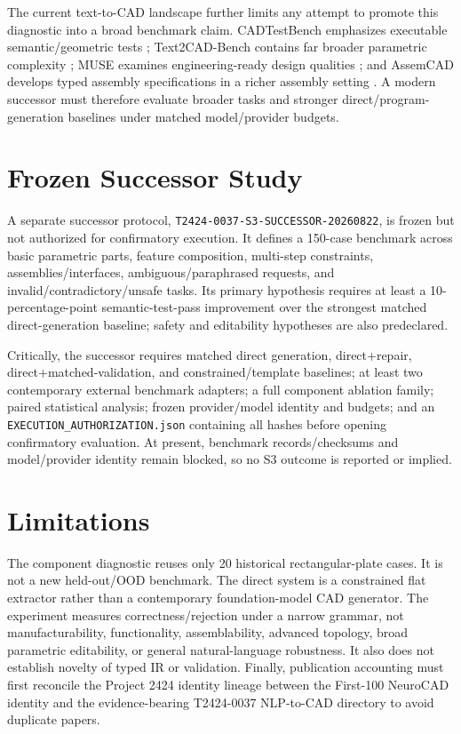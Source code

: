 \documentclass[10pt]{article}
\begin{document}
The current text-to-CAD landscape further limits any attempt to promote this diagnostic into a broad benchmark claim. CADTestBench emphasizes executable semantic/geometric tests \cite{mallis2026cadtests}; Text2CAD-Bench contains far broader parametric complexity \cite{wang2026text2cadbench}; MUSE examines engineering-ready design qualities \cite{dong2026muse}; and AssemCAD develops typed assembly specifications in a richer assembly setting \cite{dong2026assemcad}. A modern successor must therefore evaluate broader tasks and stronger direct/program-generation baselines under matched model/provider budgets.

\section{Frozen Successor Study}
A separate successor protocol, \texttt{T2424-0037-S3-SUCCESSOR-20260822}, is frozen but not authorized for confirmatory execution. It defines a 150-case benchmark across basic parametric parts, feature composition, multi-step constraints, assemblies/interfaces, ambiguous/paraphrased requests, and invalid/contradictory/unsafe tasks. Its primary hypothesis requires at least a 10-percentage-point semantic-test-pass improvement over the strongest matched direct-generation baseline; safety and editability hypotheses are also predeclared.

Critically, the successor requires matched direct generation, direct+repair, direct+matched-validation, and constrained/template baselines; at least two contemporary external benchmark adapters; a full component ablation family; paired statistical analysis; frozen provider/model identity and budgets; and an \texttt{EXECUTION\_AUTHORIZATION.json} containing all hashes before opening confirmatory evaluation. At present, benchmark records/checksums and model/provider identity remain blocked, so no S3 outcome is reported or implied.

\section{Limitations}
The component diagnostic reuses only 20 historical rectangular-plate cases. It is not a new held-out/OOD benchmark. The direct system is a constrained flat extractor rather than a contemporary foundation-model CAD generator. The experiment measures correctness/rejection under a narrow grammar, not manufacturability, functionality, assemblability, advanced topology, broad parametric editability, or general natural-language robustness. It also does not establish novelty of typed IR or validation. Finally, publication accounting must first reconcile the Project 2424 identity lineage between the First-100 NeuroCAD identity and the evidence-bearing T2424-0037 NLP-to-CAD directory to avoid duplicate papers.
\end{document}
